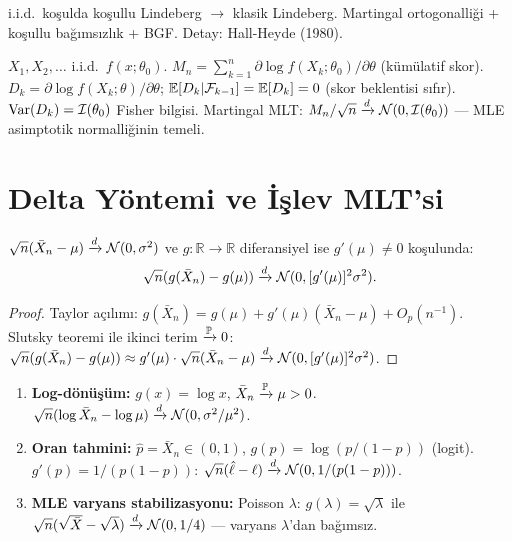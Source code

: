 \begin{ispatiskele}
i.i.d.\ koşulda koşullu Lindeberg $\to$ klasik Lindeberg. Martingal ortogonalliği + koşullu bağımsızlık + BGF. Detay: Hall-Heyde (1980).
\end{ispatiskele}

\begin{ornek}\label{ex:skor_mart}
$X_1,X_2,\ldots$ i.i.d.\ $f(x;\theta_0)$. $M_n=\sum_{k=1}^n\partial\log f(X_k;\theta_0)/\partial\theta$ (kümülatif skor). $D_k=\partial\log f(X_k;\theta)/\partial\theta$; $\mathbb{E}[D_k|\mathcal{F}_{k-1}]=\mathbb{E}[D_k]=0$ (skor beklentisi sıfır). $\operatorname{Var}(D_k)=\mathcal{I}(\theta_0)$ Fisher bilgisi. Martingal MLT: $M_n/\sqrt{n}\xrightarrow{d}\mathcal{N}(0,\mathcal{I}(\theta_0))$ --- MLE asimptotik normalliğinin temeli.
\end{ornek}

\section{Delta Yöntemi ve İşlev MLT'si}
\label{sec:delta_yontemi}

\begin{tanim}\label{def:delta}
$\sqrt{n}(\bar X_n - \mu)\xrightarrow{d}\mathcal{N}(0,\sigma^2)$ ve $g:\mathbb{R}\to\mathbb{R}$ diferansiyel ise $g'(\mu)\neq0$ koşulunda:
\[
  \sqrt{n}(g(\bar X_n)-g(\mu))\xrightarrow{d}\mathcal{N}(0,[g'(\mu)]^2\sigma^2).
\]
\end{tanim}

\begin{proof}
Taylor açılımı: $g(\bar X_n)=g(\mu)+g'(\mu)(\bar X_n-\mu)+O_p(n^{-1})$. Slutsky teoremi ile ikinci terim $\xrightarrow{\mathbb{P}}0$:
$\sqrt{n}(g(\bar X_n)-g(\mu))\approx g'(\mu)\cdot\sqrt{n}(\bar X_n-\mu)\xrightarrow{d}\mathcal{N}(0,[g'(\mu)]^2\sigma^2)$.
\end{proof}

\begin{ornek}\label{ex:delta_uyg}
\begin{enumerate}
  \item \textbf{Log-dönüşüm:} $g(x)=\log x$, $\bar X_n\xrightarrow{\mathbb{P}}\mu>0$. $\sqrt{n}(\log\bar X_n-\log\mu)\xrightarrow{d}\mathcal{N}(0,\sigma^2/\mu^2)$.
  \item \textbf{Oran tahmini:} $\hat p=\bar X_n\in(0,1)$, $g(p)=\log(p/(1-p))$ (logit). $g'(p)=1/(p(1-p))$: $\sqrt{n}(\hat\ell-\ell)\xrightarrow{d}\mathcal{N}(0,1/(p(1-p)))$.
  \item \textbf{MLE varyans stabilizasyonu:} Poisson $\lambda$: $g(\lambda)=\sqrt{\lambda}$ ile $\sqrt{n}(\sqrt{\bar X}-\sqrt\lambda)\xrightarrow{d}\mathcal{N}(0,1/4)$ --- varyans $\lambda$'dan bağımsız.
\end{enumerate}
\end{ornek}

